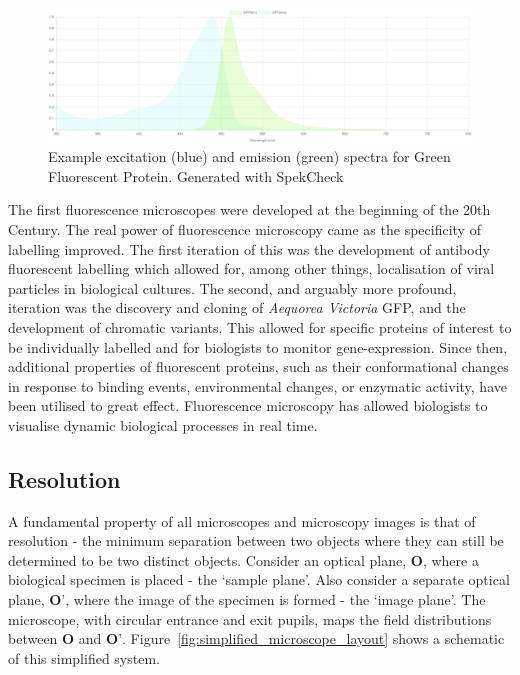 \begin{figure}[h]
	\centering
	\includegraphics[width=\textwidth]{images/GFP_emission_absorption_spectra.jpg}
	\caption[Example excitation and emission spectra]{Example excitation (blue) 
		and emission (green) spectra for Green Fluorescent Protein. Generated with SpekCheck\cite{phillips2018spekcheck}}
	\label{fig:GFP_emission_absorption_spectra}
\end{figure}

The first fluorescence microscopes were developed at the beginning of the 20th Century\cite{renz2013fluorescence,yuste2005fluorescence}. The real power of 
fluorescence microscopy came as the specificity of labelling improved. The 
first iteration of this was the development of antibody fluorescent labelling 
which allowed for, among other things, localisation of viral particles in 
biological 
cultures\cite{coons1942demonstration,coons1951fluorescent,weller1954fluorescent}.
The second, and arguably more profound, iteration was the discovery and 
cloning of \textit{Aequorea Victoria} GFP, and the development of chromatic
variants\cite{prasher1992primary,heim1996engineering}. This allowed for 
specific proteins of interest to be individually labelled and for biologists 
to monitor gene-expression\cite{chalfie1994green}. Since then, additional 
properties of fluorescent proteins, such as their conformational changes 
in response to binding events, environmental changes, or enzymatic activity, 
have been utilised to great effect\cite{toseland2013fluorescent}. 
Fluorescence microscopy has allowed biologists to visualise dynamic biological
processes in real time.

\subsection{Resolution}
\label{subsec:resolution}

A fundamental property of all microscopes and microscopy images is that of 
resolution - the minimum separation between two objects where they can still
be determined to be two distinct objects. Consider an optical plane, 
$\textbf{O}$, where a biological specimen is placed - the `sample plane'. Also
consider a separate optical plane, $\textbf{O'}$, where the image of the
specimen is formed - the `image plane'. The microscope, with circular entrance
and exit pupils, maps the field distributions between $\textbf{O}$ and 
$\textbf{O'}$. Figure~\ref{fig:simplified_microscope_layout} shows a schematic
of this simplified system.

